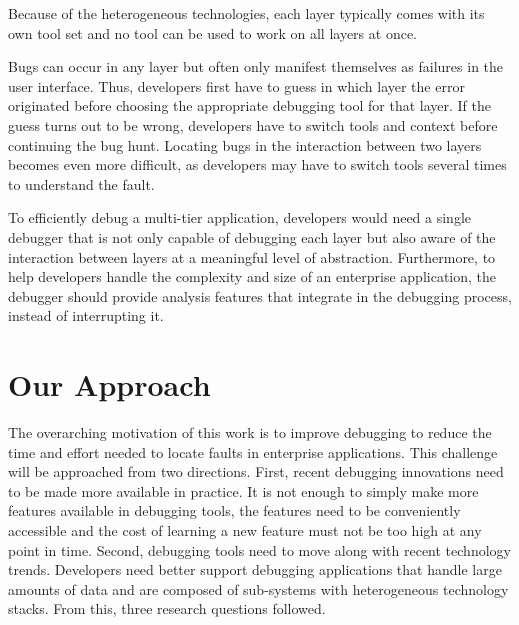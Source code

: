 Because of the heterogeneous technologies, each layer typically comes with its own tool set and no tool can be used to work on all layers at once.

Bugs can occur in any layer but often only manifest themselves as failures in the user interface.
Thus, developers first have to guess in which layer the error originated before choosing the appropriate debugging tool for that layer.
If the guess turns out to be wrong, developers have to switch tools and context before continuing the bug hunt.
Locating bugs in the interaction between two layers becomes even more difficult, as developers may have to switch tools several times to understand the fault.

To efficiently debug a multi-tier application, developers would need a single debugger that is not only capable of debugging each layer but also aware of the interaction between layers at a meaningful level of abstraction.
Furthermore, to help developers handle the complexity and size of an enterprise application, the debugger should provide analysis features that integrate in the debugging process, instead of interrupting it.

\section{Our Approach} %

The overarching motivation of this work is to improve debugging to reduce the time and effort needed to locate faults in enterprise applications.
This challenge will be approached from two directions.
First, recent debugging innovations need to be made more available in practice.
It is not enough to simply make more features available in debugging tools, the features need to be conveniently accessible and the cost of learning a new feature must not be too high at any point in time.
Second, debugging tools need to move along with recent technology trends.
Developers need better support debugging applications that handle large amounts of data and are composed of sub-systems with heterogeneous technology stacks.
From this, three research questions followed.

\newcommand{\RQ}[1]{\subsection*{#1}}

